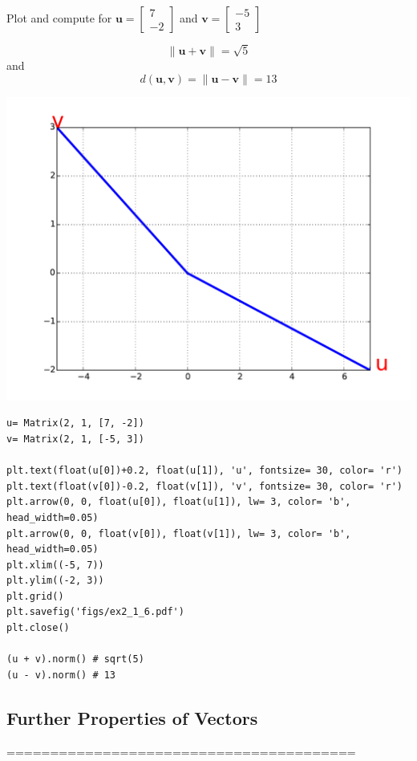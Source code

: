 Plot and compute for $\mathbf{u} = \left[\begin{matrix}7\\-2\end{matrix}\right]$
and $\mathbf{v} = \left[\begin{matrix}-5\\3\end{matrix}\right]$

$$\|\mathbf{u} + \mathbf{v} \| = \sqrt{5}$$
and
$$d(\mathbf{u}, \mathbf{v}) = \|\mathbf{u} - \mathbf{v} \| = 13$$

\includegraphics[width=\linewidth]{figs/ex2_1_6.pdf}

\begin{verbatim}
u= Matrix(2, 1, [7, -2])
v= Matrix(2, 1, [-5, 3])

plt.text(float(u[0])+0.2, float(u[1]), 'u', fontsize= 30, color= 'r')
plt.text(float(v[0])-0.2, float(v[1]), 'v', fontsize= 30, color= 'r')
plt.arrow(0, 0, float(u[0]), float(u[1]), lw= 3, color= 'b', head_width=0.05)
plt.arrow(0, 0, float(v[0]), float(v[1]), lw= 3, color= 'b', head_width=0.05)
plt.xlim((-5, 7))
plt.ylim((-2, 3))
plt.grid()
plt.savefig('figs/ex2_1_6.pdf')
plt.close()

(u + v).norm() # sqrt(5)
(u - v).norm() # 13
\end{verbatim}


\subsection{Further Properties of Vectors}
========================================


